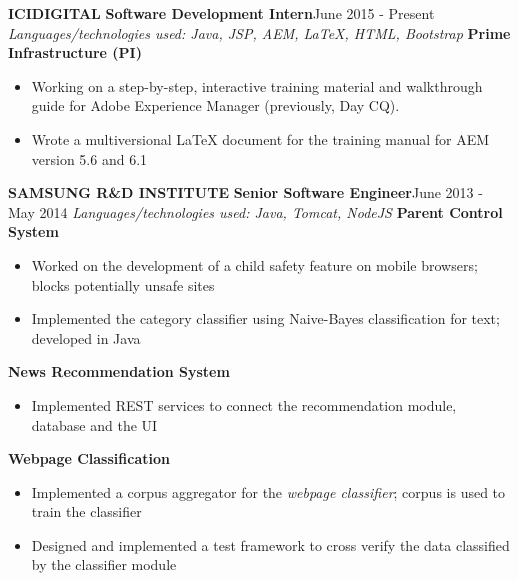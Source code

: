 \documentclass[10pt, letterpaper]{article}
\begin{document}
\begin{multicols}{2}
			\vspace{0.2cm}
			{\bfseries ICIDIGITAL}\newline
			{\bfseries \small Software Development Intern}\hfill{June 2015 - Present}\newline			
				\textit{Languages/technologies used: Java, JSP, AEM, LaTeX, HTML, Bootstrap}\newline
				{\bfseries Prime Infrastructure (PI)}
				\begin{itemize}[nolistsep,leftmargin=*]
					\item Working on a step-by-step, interactive training material and walkthrough guide for Adobe Experience Manager (previously, Day CQ). 
					\item Wrote a multiversional LaTeX document for the training manual for AEM version 5.6 and 6.1
				\end{itemize}


			\vspace{0.2cm}
			{\bfseries SAMSUNG R\&D INSTITUTE}\newline
			{\bfseries \small Senior Software Engineer}\hfill{June 2013 - May 2014}\newline
				\textit{Languages/technologies used: Java, Tomcat, NodeJS}\newline
				{\bfseries Parent Control System}
				\begin{itemize}[nolistsep,leftmargin=*]
					\item Worked on the development of a child safety feature on mobile browsers; blocks potentially unsafe sites
					\item Implemented the category classifier using Naive-Bayes classification for text; developed in Java
				\end{itemize}
				{\bfseries News Recommendation System}
				\begin{itemize}[nolistsep,leftmargin=*]
					\item Implemented REST services to connect the recommendation module, database and the UI
				\end{itemize}
				{\bfseries Webpage Classification}
				\begin{itemize}[nolistsep,leftmargin=*]
					\item Implemented a corpus aggregator for the \textit{webpage classifier}; corpus is used to train the classifier
					\item Designed and implemented a test framework to cross verify the data classified by the classifier module
				\end{itemize}
			\vspace{0.2cm}


\end{multicols}
\end{document}
